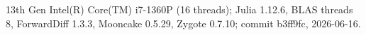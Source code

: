 13th Gen Intel(R) Core(TM) i7-1360P (16 threads); Julia 1.12.6, BLAS threads 8, ForwardDiff 1.3.3, Mooncake 0.5.29, Zygote 0.7.10; commit b3ff9fc, 2026-06-16.